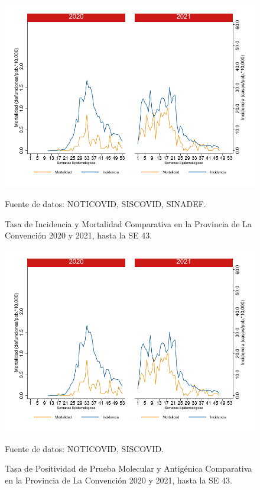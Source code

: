 \documentclass[12pt,a4paper,openany]{book}
\begin{document}
		\begin{figure}[h]
			\caption{Tasa de Incidencia y Mortalidad Comparativa en la Provincia de La Convención 2020 y 2021, hasta la SE 43.}\label{fig:inc_mort_laconv}
			\begin{center}
				\includegraphics[width=0.7\linewidth]{../figuras/incidencia_mortalidad_20_21_9}
			\end{center}
			{\footnotesize {Fuente de datos: NOTICOVID, SISCOVID, SINADEF.}}
		\end{figure}
		
		\begin{figure}[h]
			\caption{Tasa de Positividad de Prueba Molecular y Antigénica Comparativa en la Provincia de La Convención 2020 y 2021, hasta la SE 43.}\label{fig:positividad_laconv}
			\begin{center}
				\includegraphics[width=0.7\linewidth]{../figuras/incidencia_mortalidad_20_21_9}
			\end{center}
			{\footnotesize {Fuente de datos: NOTICOVID, SISCOVID.}}
		\end{figure}
		
\end{document}

